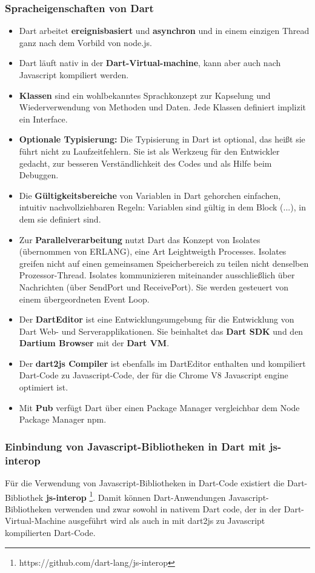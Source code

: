 \subsubsection{Spracheigenschaften von Dart}\label{s.Spracheigenschaften von Dart}
\begin{itemize}

\item Dart arbeitet {\bf ereignisbasiert} und {\bf asynchron} und in einem einzigen Thread ganz nach dem Vorbild von node.js.
\item  Dart läuft nativ in der {\bf Dart-Virtual-machine}, kann aber auch nach Javascript kompiliert werden.
 
\item {\bf Klassen } sind ein wohlbekanntes Sprachkonzept zur Kapselung und Wiederverwendung von Methoden und Daten. Jede Klassen definiert implizit ein Interface.
\item {\bf Optionale Typisierung:}
Die Typisierung in Dart ist optional, das heißt sie führt nicht zu Laufzeitfehlern. Sie ist als Werkzeug für den Entwickler gedacht, zur besseren Verständlichkeit des Codes und als Hilfe beim Debuggen.
\item Die  {\bf Gültigkeitsbereiche}
von Variablen in Dart gehorchen einfachen, intuitiv nachvollziehbaren Regeln: Variablen sind gültig in dem Block ({...}), in dem sie definiert sind.
\item
Zur {\bf Parallelverarbeitung} nutzt Dart das Konzept von Isolates (übernommen von ERLANG), eine Art Leightweigth Processes. Isolates greifen nicht auf einen gemeinsamen Speicherbereich zu teilen nicht denselben Prozessor-Thread. Isolates kommunizieren miteinander ausschließlich über Nachrichten (über SendPort und ReceivePort). Sie werden gesteuert von einem übergeordneten Event Loop.
\item Der {\bf DartEditor} ist eine Entwicklungsumgebung für die Entwicklung von Dart Web- und Serverapplikationen. Sie beinhaltet das {\bf Dart SDK } und den {\bf Dartium Browser} mit der {\bf Dart VM}.
\item Der {\bf dart2js Compiler} ist ebenfalls im DartEditor enthalten und kompiliert Dart-Code zu Javascript-Code, der für die Chrome V8 Javascript engine optimiert ist.
\item Mit {\bf Pub} verfügt Dart über einen Package Manager vergleichbar dem Node Package Manager npm.
\end{itemize}
\cite{dartvsjs}\cite{builddartapps}

\subsubsection{Einbindung von Javascript-Bibliotheken in Dart mit js-interop}\label{js-interop}
Für die Verwendung von Javascript-Bibliotheken in Dart-Code existiert die Dart-Bibliothek {\bf js-interop} \footnote{https://github.com/dart-lang/js-interop}. Damit können Dart-Anwendungen Javascript-Bibliotheken verwenden und zwar sowohl in nativem Dart code, der in der Dart-Virtual-Machine ausgeführt wird als auch in mit dart2js zu Javascript kompilierten Dart-Code.\\

